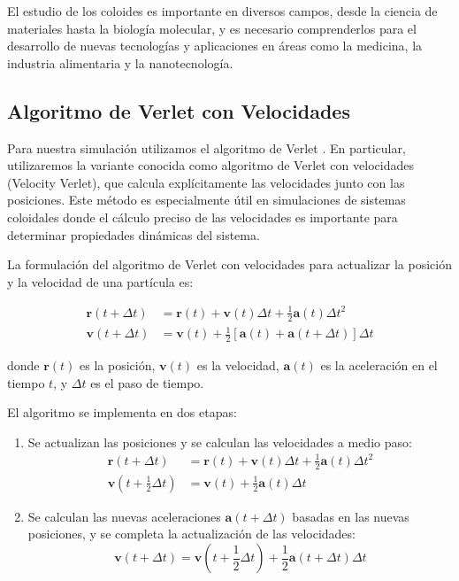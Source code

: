 \documentclass[twocolumn]{article}
\begin{document}
El estudio de los coloides es importante en diversos campos, desde la ciencia de materiales hasta la biología molecular, y es necesario comprenderlos para el desarrollo de nuevas tecnologías y aplicaciones en áreas como la medicina, la industria alimentaria y la nanotecnología.

\subsection*{Algoritmo de Verlet con Velocidades}
Para nuestra simulación utilizamos el algoritmo de Verlet \cite{verlet_wiki}. En particular, utilizaremos la variante conocida como algoritmo de Verlet con velocidades (Velocity Verlet), que calcula explícitamente las velocidades junto con las posiciones. Este método es especialmente útil en simulaciones de sistemas coloidales donde el cálculo preciso de las velocidades es importante para determinar propiedades dinámicas del sistema.

La formulación del algoritmo de Verlet con velocidades para actualizar la posición y la velocidad de una partícula es:

\begin{align}
    \mathbf{r}(t + \Delta t) &= \mathbf{r}(t) + \mathbf{v}(t)\Delta t + \frac{1}{2}\mathbf{a}(t)\Delta t^2 \\
    \mathbf{v}(t + \Delta t) &= \mathbf{v}(t) + \frac{1}{2}[\mathbf{a}(t) + \mathbf{a}(t + \Delta t)]\Delta t
\end{align}

donde $\mathbf{r}(t)$ es la posición, $\mathbf{v}(t)$ es la velocidad, $\mathbf{a}(t)$ es la aceleración en el tiempo $t$, y $\Delta t$ es el paso de tiempo.

El algoritmo se implementa en dos etapas:
\begin{enumerate}
    \item Se actualizan las posiciones y se calculan las velocidades a medio paso:
    \begin{align}
        \mathbf{r}(t + \Delta t) &= \mathbf{r}(t) + \mathbf{v}(t)\Delta t + \frac{1}{2}\mathbf{a}(t)\Delta t^2 \\
        \mathbf{v}(t + \frac{1}{2}\Delta t) &= \mathbf{v}(t) + \frac{1}{2}\mathbf{a}(t)\Delta t
    \end{align}
    \item Se calculan las nuevas aceleraciones $\mathbf{a}(t + \Delta t)$ basadas en las nuevas posiciones, y se completa la actualización de las velocidades:
    \begin{equation}
        \mathbf{v}(t + \Delta t) = \mathbf{v}(t + \frac{1}{2}\Delta t) + \frac{1}{2}\mathbf{a}(t + \Delta t)\Delta t
    \end{equation}
\end{enumerate}
\end{document}
